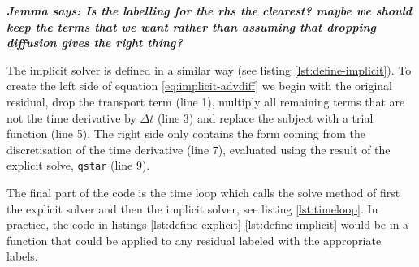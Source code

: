 \documentclass[journal abbreviation, manuscript]{copernicus}
\newcommand{\JScomment}[1]{\textit{\textbf{Jemma says: #1}}}
\begin{document}
\JScomment{Is the
  labelling for the rhs the clearest? maybe we should keep the terms
  that we want rather than assuming that dropping diffusion gives the
  right thing?}



The implicit solver is defined in a similar way (see listing
\ref{lst:define-implicit}). To create the left side of equation
\ref{eq:implicit-advdiff} we begin with the original residual, drop
the transport term (line 1), multiply all remaining terms that are not
the time derivative by $\Delta t$ (line 3) and replace the subject
with a trial function (line 5). The right side only contains the form
coming from the discretisation of the time derivative (line 7),
evaluated using the result of the explicit solve, \texttt{qstar} (line
9).



The final part of the code is the time loop which calls the solve
method of first the explicit solver and then the implicit solver, see
listing \ref{lst:timeloop}. In practice, the code in listings
\ref{lst:define-explicit}-\ref{lst:define-implicit} would be in a
function that could be applied to any residual labeled with the
appropriate labels.


\end{document}
